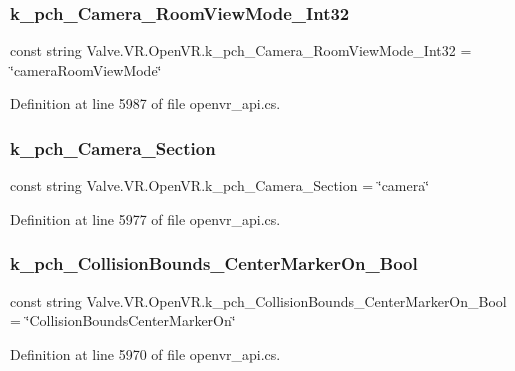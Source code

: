 \subsubsection{\texorpdfstring{k\_pch\_Camera\_RoomViewMode\_Int32}{k\_pch\_Camera\_RoomViewMode\_Int32}}
{\footnotesize\ttfamily const string Valve.\+V\+R.\+Open\+V\+R.\+k\+\_\+pch\+\_\+\+Camera\+\_\+\+Room\+View\+Mode\+\_\+\+Int32 = \char`\"{}camera\+Room\+View\+Mode\char`\"{}}



Definition at line 5987 of file openvr\+\_\+api.\+cs.

\mbox{\label{class_valve_1_1_v_r_1_1_open_v_r_a672890e15a0078255422fff40b41779b}} 
\subsubsection{\texorpdfstring{k\_pch\_Camera\_Section}{k\_pch\_Camera\_Section}}
{\footnotesize\ttfamily const string Valve.\+V\+R.\+Open\+V\+R.\+k\+\_\+pch\+\_\+\+Camera\+\_\+\+Section = \char`\"{}camera\char`\"{}}



Definition at line 5977 of file openvr\+\_\+api.\+cs.

\mbox{\label{class_valve_1_1_v_r_1_1_open_v_r_ac9bbd5c692cba16e7423452f5e32b8e0}} 
\subsubsection{\texorpdfstring{k\_pch\_CollisionBounds\_CenterMarkerOn\_Bool}{k\_pch\_CollisionBounds\_CenterMarkerOn\_Bool}}
{\footnotesize\ttfamily const string Valve.\+V\+R.\+Open\+V\+R.\+k\+\_\+pch\+\_\+\+Collision\+Bounds\+\_\+\+Center\+Marker\+On\+\_\+\+Bool = \char`\"{}Collision\+Bounds\+Center\+Marker\+On\char`\"{}}



Definition at line 5970 of file openvr\+\_\+api.\+cs.

